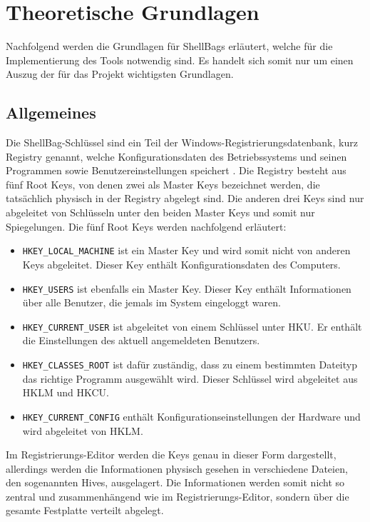 \section{Theoretische Grundlagen}
\vspace{0.5cm}
Nachfolgend werden die Grundlagen für ShellBags erläutert, welche für die Implementierung des Tools notwendig sind. Es handelt sich somit nur um einen Auszug der für das Projekt wichtigsten Grundlagen. 

\subsection{Allgemeines}
\vspace{0.3cm}
Die ShellBag-Schlüssel sind ein Teil der Windows-Registrierungsdatenbank, kurz Registry genannt, welche Konfigurationsdaten des Betriebssystems und seinen Programmen sowie Benutzereinstellungen speichert \cite[S.215]{anson2012mastering}. Die Registry besteht aus fünf Root Keys, von denen zwei als Master Keys bezeichnet werden, die tatsächlich physisch in der Registry abgelegt sind. Die anderen drei Keys sind nur abgeleitet von Schlüsseln unter den beiden Master Keys und somit nur Spiegelungen. \cite[S.219]{anson2012mastering} 
\newpage
Die fünf Root Keys werden nachfolgend erläutert:
\begin{itemize}
	\item \texttt{HKEY\_LOCAL\_MACHINE} ist ein Master Key und wird somit nicht von anderen Keys abgeleitet. Dieser Key enthält Konfigurationsdaten des Computers.
	\item \texttt{HKEY\_USERS} ist ebenfalls ein Master Key. Dieser Key enthält Informationen über alle Benutzer, die jemals im System eingeloggt waren.
	\item  \texttt{HKEY\_CURRENT\_USER} ist abgeleitet von einem Schlüssel unter HKU. Er enthält die Einstellungen des aktuell angemeldeten Benutzers.
	\item \texttt{HKEY\_CLASSES\_ROOT} ist dafür zuständig, dass zu einem bestimmten Dateityp das richtige Programm ausgewählt wird. Dieser Schlüssel wird abgeleitet aus HKLM und HKCU.
	\item \texttt{HKEY\_CURRENT\_CONFIG} enthält Konfigurationseinstellungen der Hardware und wird abgeleitet von HKLM. \cite[S.219]{anson2012mastering}
\end{itemize}
Im Registrierungs-Editor werden die Keys genau in dieser Form dargestellt, allerdings werden die Informationen physisch gesehen in verschiedene Dateien, den sogenannten Hives, ausgelagert. Die Informationen werden somit nicht so zentral und zusammenhängend wie im Registrierungs-Editor, sondern über die gesamte Festplatte verteilt abgelegt. \cite[S.220]{anson2012mastering} 

